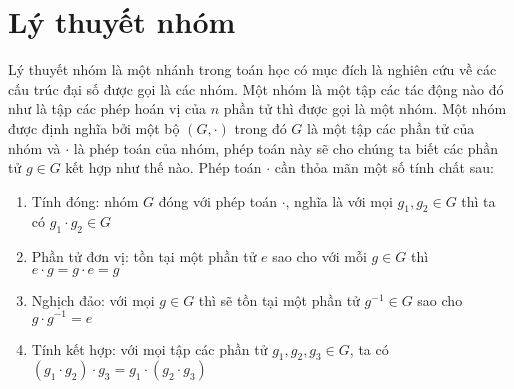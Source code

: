\section{Lý thuyết nhóm}
Lý thuyết nhóm là một nhánh trong toán học có mục đích là nghiên cứu về các cấu trúc đại số được gọi là các nhóm. Một nhóm là một tập các tác động nào đó như là tập các phép hoán vị của $n$ phần tử thì được gọi là một nhóm. Một nhóm được định nghĩa bởi một bộ $(G, \cdot)$ trong đó $G$ là một tập các phần tử của nhóm và $\cdot$ là phép toán của nhóm, phép toán này sẽ cho chúng ta biết các phần tử $g \in G$ kết hợp như thế nào. Phép toán $\cdot$ cần thỏa mãn một số tính chất sau:
\begin{enumerate}
    \item Tính đóng: nhóm $G$ đóng với phép toán $\cdot$, nghĩa là với mọi $g_1, g_2 \in G$ thì ta có $g_1 \cdot g_2 \in G$

    \item Phần tử đơn vị: tồn tại một phần tử $e$ sao cho với mỗi $g \in G$ thì $e \cdot g = g \cdot e = g$

    \item Nghịch đảo: với mọi $g \in G$ thì sẽ tồn tại một phần tử $g^{-1} \in G$ sao cho $g \cdot g^{-1} = e$

    \item Tính kết hợp: với mọi tập các phần tử $g_1, g_2, g_3 \in G$, ta có $(g_1 \cdot g_2) \cdot g_3 = g_1 \cdot (g_2 \cdot g_3)$
\end{enumerate}

